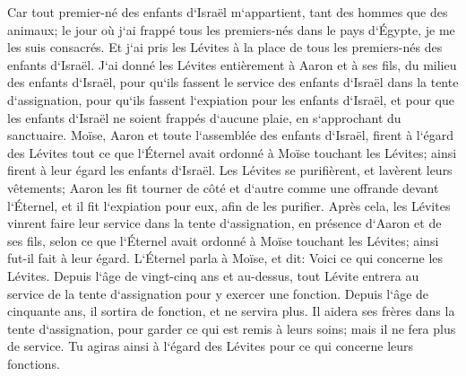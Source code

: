 \verse Car tout premier-né des enfants d`Israël m`appartient, tant des hommes que des animaux; le jour où j`ai frappé tous les premiers-nés dans le pays d`Égypte, je me les suis consacrés. 
\verse Et j`ai pris les Lévites à la place de tous les premiers-nés des enfants d`Israël. 
\verse J`ai donné les Lévites entièrement à Aaron et à ses fils, du milieu des enfants d`Israël, pour qu`ils fassent le service des enfants d`Israël dans la tente d`assignation, pour qu`ils fassent l`expiation pour les enfants d`Israël, et pour que les enfants d`Israël ne soient frappés d`aucune plaie, en s`approchant du sanctuaire. 
\verse Moïse, Aaron et toute l`assemblée des enfants d`Israël, firent à l`égard des Lévites tout ce que l`Éternel avait ordonné à Moïse touchant les Lévites; ainsi firent à leur égard les enfants d`Israël. 
\verse Les Lévites se purifièrent, et lavèrent leurs vêtements; Aaron les fit tourner de côté et d`autre comme une offrande devant l`Éternel, et il fit l`expiation pour eux, afin de les purifier. 
\verse Après cela, les Lévites vinrent faire leur service dans la tente d`assignation, en présence d`Aaron et de ses fils, selon ce que l`Éternel avait ordonné à Moïse touchant les Lévites; ainsi fut-il fait à leur égard. 
\verse L`Éternel parla à Moïse, et dit: 
\verse Voici ce qui concerne les Lévites. Depuis l`âge de vingt-cinq ans et au-dessus, tout Lévite entrera au service de la tente d`assignation pour y exercer une fonction. 
\verse Depuis l`âge de cinquante ans, il sortira de fonction, et ne servira plus. 
\verse Il aidera ses frères dans la tente d`assignation, pour garder ce qui est remis à leurs soins; mais il ne fera plus de service. Tu agiras ainsi à l`égard des Lévites pour ce qui concerne leurs fonctions. 

